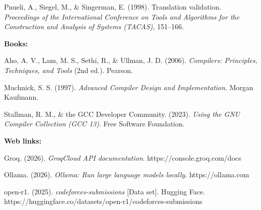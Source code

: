 \documentclass[12pt,a4paper]{report}
\newcommand{\apa}[1]{\par\hangindent=1.27cm\hangafter=1 #1\par}
\newcommand{\refgroup}[1]{\par\vspace{0.35cm}\noindent\textbf{#1}\par\vspace{0.1cm}}
\begin{document}
\apa{Pnueli, A., Siegel, M., \& Singerman, E. (1998). Translation validation. \textit{Proceedings of the International Conference on Tools and Algorithms for the Construction and Analysis of Systems (TACAS)}, 151--166.}

\refgroup{Books:}

\apa{Aho, A. V., Lam, M. S., Sethi, R., \& Ullman, J. D. (2006). \textit{Compilers: Principles, Techniques, and Tools} (2nd ed.). Pearson.}

\apa{Muchnick, S. S. (1997). \textit{Advanced Compiler Design and Implementation}. Morgan Kaufmann.}

\apa{Stallman, R. M., \& the GCC Developer Community. (2023). \textit{Using the GNU Compiler Collection (GCC 13)}. Free Software Foundation.}

\refgroup{Web links:}

\apa{Groq. (2026). \textit{GroqCloud API documentation}. https://console.groq.com/docs}

\apa{Ollama. (2026). \textit{Ollama: Run large language models locally}. https://ollama.com}


\apa{open-r1. (2025). \textit{codeforces-submissions} [Data set]. Hugging Face. https://huggingface.co/datasets/open-r1/codeforces-submissions}
\end{document}
